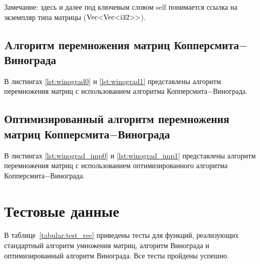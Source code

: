 Замечание: здесь и далее под ключевым словом self понимается ссылка на экземпляр типа матрицы ($\text{Vec<Vec<i32>\hspace{0pt}>}$).
\newpage

\subsection{Aлгоритм перемножения матриц Копперсмита$-$Винограда}

В листингах \ref{lst:winograd0} и \ref{lst:winograd1} представлены алгоритм перемножения матриц с использованием алгоритма Копперсмита$-$Винограда.


\newpage

\newpage

\subsection{Оптимизированный алгоритм перемножения матриц Копперсмита$-$Винограда}

В листингах \ref{lst:winograd_imp0} и \ref{lst:winograd_imp1} представлены алгоритм перемножения матриц с использованием оптимизированного алгоритма Копперсмита$-$Винограда.


\newpage

\newpage
\section{Тестовые данные}

В таблице~\ref{tabular:test_rec} приведены тесты для функций, реализующих стандартный алгоритм умножения матриц, алгоритм Винограда и оптимизированный алгоритм Винограда.
Все тесты пройдены успешно.

